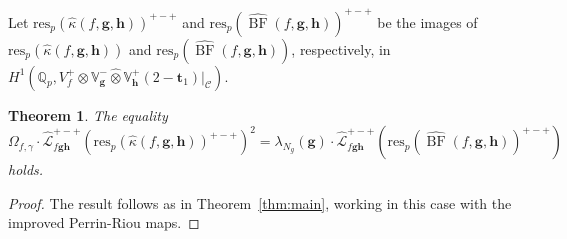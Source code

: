 \documentclass[a4paper,11pt]{amsart}
\theoremstyle{plain}
\newtheorem{theorem}{Theorem}[section]
\newtheorem{propo}[theorem]{Proposition}
\theoremstyle{definition}
\theoremstyle{remark}
\newcommand{\bb}{\mathbb}
\newcommand{\cl}{\mathcal}
\DeclareMathOperator{\BF}{BF}
\DeclareMathOperator{\bal}{bal}
\newcommand{\Lp}{{\mathscr{L}_p}}
\newcommand{\hf}{{\mathbf{f}}}
\newcommand{\hg}{{\mathbf{g}}}
\newcommand{\hh}{{\mathbf h}}
\newcommand{\res}{\mathrm{res}}
\numberwithin{equation}{section}
\begin{document}

Let $\res_p(\widehat{\kappa}(f,\hg,\hh))^{+-+}$ and $\res_p(\widehat{\BF}(f,\hg,\hh))^{+-+}$ be the images of $\res_p(\widehat{\kappa}(f,\hg,\hh))$ and $\res_p(\widehat{\BF}(f,\hg,\hh))$, respectively, in $H^1(\bb{Q}_p,V_f^+\otimes\bb{V}_\hg^-\hat{\otimes}\bb{V}_\hh^+(2-\mathbf{t}_1)\vert_{\cl{C}})$.

\begin{theorem}\label{thm:bf-vs-cycles-fam}
The equality
\[
\Omega_{f,\gamma} \cdot \widehat{\cl{L}}_{f\hg\hh}^{+-+}(\res_p(\widehat{\kappa}(f,\hg,\hh))^{+-+})^2 =\lambda_{N_g}(\hg) \cdot \widehat{\mathcal{L}}_{f\hg\hh}^{+-+}(\res_p(\widehat{\BF}(f, \hg, \hh))^{+-+})
\]
holds. %
\end{theorem}
\begin{proof}
The result follows as in Theorem~\ref{thm:main}, working in this case with the improved Perrin-Riou maps.
\end{proof}
\end{document}
